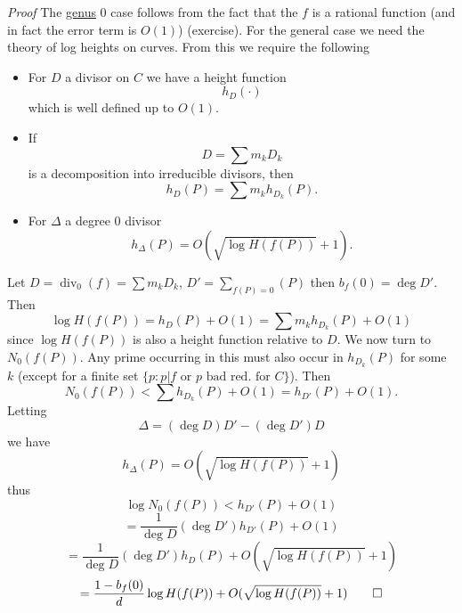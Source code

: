 \documentclass[10pt,]{book}
\makeatletter
\renewcommand*{\proofname}{Proof}
\renewenvironment{proof}[1][\proofname]{\par
  \pushQED{\qed}%
  \normalfont \topsep6\p@\@plus6\p@\relax
  \trivlist
  \item\relax
    {\itshape
    #1\@addpunct{.}}\hspace\labelsep\ignorespaces
}{%
  \popQED\endtrivlist\@endpefalse
}
\numberwithin{equation}{section}
\DeclareMathOperator{\divisor}{div}
\newcommand{\lt}{<}
\makeatother
\begin{document}
\begin{proof}\hypertarget{proof-98}{}
\hypertarget{p-688}{}%
The \hyperref[fact-existance-genus]{genus} 0 case follows from the fact that the \(f\) is a rational function (and in fact the error term is \(O(1)\)) (exercise). For the general case we need the theory of log heights on curves. From this we require the following\leavevmode%
\begin{itemize}[label=\textbullet]
\item{}For \(D\) a divisor on \(C\) we have  a height function%
\begin{equation*}
h_D(\cdot)
\end{equation*}
which is well defined up to  \(O(1)\).%
\item{}If%
\begin{equation*}
D=  \sum m_k D_k
\end{equation*}
is a decomposition into irreducible divisors, then%
\begin{equation*}
h_D(P) = \sum m_k h_{D_k}(P)\text{.}
\end{equation*}
%
\item{}For \(\Delta\) a degree 0 divisor%
\begin{equation*}
h_{\Delta} (P) = O(\sqrt{\log H(f(P))} + 1)\text{.}
\end{equation*}
%
\end{itemize}
%
\par
\hypertarget{p-689}{}%
Let \(D = \divisor_0(f) = \sum m_k D_k\), \(D' = \sum_{f(P) = 0} (P)\) then \(b_f(0) = \deg D'\). Then%
\begin{equation*}
\log H(f(P)) = h_D(P) + O(1) = \sum m_k h_{D_k}(P) + O(1)
\end{equation*}
since \(\log H(f(P))\) is also a height function relative to \(D\). We now turn to \(N_0(f(P))\). Any prime occurring in this must also occur in \(h_{D_k}(P)\) for some \(k\) (except for a finite set \(\{p : p|f \text{ or } p \text{ bad red. for } C\}\)). Then%
\begin{equation*}
N_0(f(P))  \lt \sum h_{D_k}(P) + O(1) = h_{D'}(P) + O(1)\text{.}
\end{equation*}
Letting%
\begin{equation*}
\Delta = (\deg D) D' - (\deg D') D
\end{equation*}
we have%
\begin{equation*}
h_{\Delta} (P) = O(\sqrt{\log H(f(P))} + 1)
\end{equation*}
thus%
\begin{equation*}
\log N_0(f(P)) \lt h_{D'} (P) + O(1)
\end{equation*}
%
\begin{equation*}
= \frac{1}{\deg D} (\deg D') h_{D'} (P) + O(1)
\end{equation*}
%
\begin{equation*}
= \frac{1}{\deg D} (\deg D') h_{D} (P) + O(\sqrt{\log H(f(P))} + 1)
\end{equation*}
%
\begin{equation*}
= \frac{1- b_f(0)}{d} \log  H(f(P)) + O(\sqrt{\log H(f(P))} + 1)\qedhere
\end{equation*}
%
\end{proof}
\end{document}

